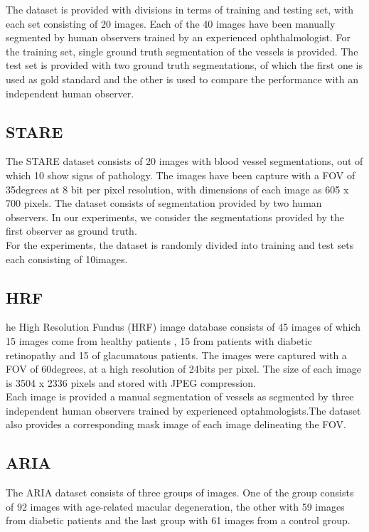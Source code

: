 The dataset is provided with divisions in terms of training and testing set, with each set consisting of 20 images. Each of the 40 images have been manually segmented by human observers trained by an experienced ophthalmologist. For the training set, single ground truth segmentation of the vessels is provided. The test set is provided with two ground truth segmentations, of which the first one is used as gold standard and the other is used to compare the performance with an independent human observer.\\
\clearpage
\subsection{STARE}
The STARE dataset \cite{hoover2000locating,hoover2003locating} consists of 20 images with blood vessel segmentations, out of which 10 show signs of pathology. The images have been capture with a FOV of 35degrees at 8 bit per pixel resolution, with dimensions of each image as 605 x 700 pixels. The dataset consists of segmentation provided by two human observers. In our experiments, we consider the segmentations provided by the first observer as ground truth.\\

For the experiments, the dataset is randomly divided into training and test sets each consisting of 10images.

\subsection{HRF}
he High Resolution Fundus (HRF) image database \cite{odstrcilik2013retinal} consists of 45 images of which 15 images come from healthy patients , 15 from patients with diabetic retinopathy and 15 of glacumatous patients. The images were captured with a FOV of 60degrees, at a high resolution of 24bits per pixel. The size of each image is 3504 x 2336 pixels and stored with JPEG compression. \\

Each image is provided a manual segmentation of vessels as segmented by three independent human observers trained by experienced optahmologists.The dataset also provides a corresponding mask image of each image delineating the FOV.

\subsection{ARIA}
The ARIA dataset \cite{farnell2008enhancement,zheng2012automated} consists of three groups of images. One of the group consists of 92 images with age-related macular degeneration, the other with 59 images from diabetic patients and the last group with 61 images from a control group.\\

